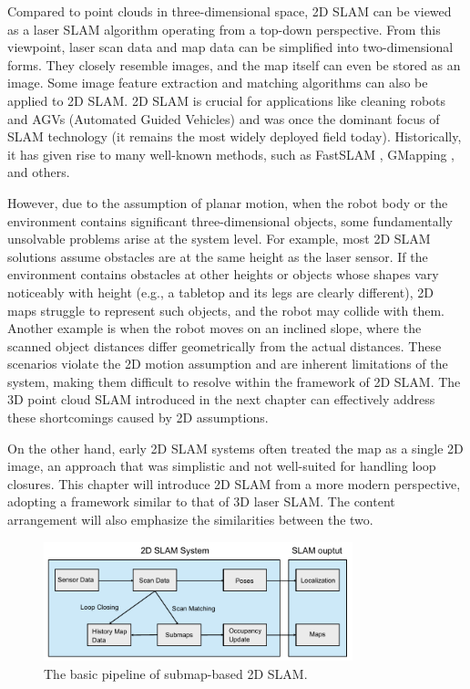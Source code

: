 Compared to point clouds in three-dimensional space, 2D SLAM can be viewed as a laser SLAM algorithm operating from a top-down perspective. From this viewpoint, laser scan data and map data can be simplified into two-dimensional forms. They closely resemble images, and the map itself can even be stored as an image. Some image feature extraction and matching algorithms can also be applied to 2D SLAM. 2D SLAM is crucial for applications like cleaning robots and AGVs (Automated Guided Vehicles) and was once the dominant focus of SLAM technology \cite{Thrun2005} (it remains the most widely deployed field today). Historically, it has given rise to many well-known methods, such as FastSLAM \cite{Montemerlo2002}, GMapping \cite{Grisetti2007a}, and others.  

However, due to the assumption of planar motion, when the robot body or the environment contains significant three-dimensional objects, some fundamentally unsolvable problems arise at the system level. For example, most 2D SLAM solutions assume obstacles are at the same height as the laser sensor. If the environment contains obstacles at other heights or objects whose shapes vary noticeably with height (e.g., a tabletop and its legs are clearly different), 2D maps struggle to represent such objects, and the robot may collide with them. Another example is when the robot moves on an inclined slope, where the scanned object distances differ geometrically from the actual distances. These scenarios violate the 2D motion assumption and are inherent limitations of the system, making them difficult to resolve within the framework of 2D SLAM. The 3D point cloud SLAM introduced in the next chapter can effectively address these shortcomings caused by 2D assumptions.  

On the other hand, early 2D SLAM systems often treated the map as a single 2D image, an approach that was simplistic and not well-suited for handling loop closures. This chapter will introduce 2D SLAM from a more modern perspective, adopting a framework similar to that of 3D laser SLAM. The content arrangement will also emphasize the similarities between the two.  

\begin{figure}[!htp]  
	\centering  
	\includegraphics[width=0.8\textwidth]{resources/2d-lidar-mapping/2d-slam-pipeline.pdf}  
	\caption{The basic pipeline of submap-based 2D SLAM.}  
	\label{fig:2d-slam-pipeline}  
\end{figure}  

